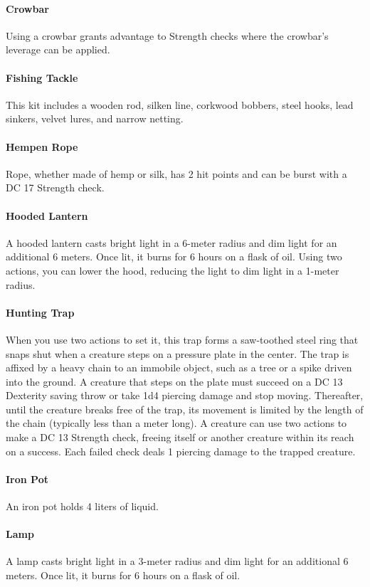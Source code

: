     \paragraph{Crowbar}
        Using a crowbar grants advantage to Strength checks where the crowbar's leverage can be applied.
    \paragraph{Fishing Tackle}
        This kit includes a wooden rod, silken line, corkwood bobbers, steel hooks, lead sinkers, velvet lures, and narrow netting.
    \paragraph{Hempen Rope}
        Rope, whether made of hemp or silk, has 2 hit points and can be burst with a DC 17 Strength check.
    \paragraph{Hooded Lantern}
        A hooded lantern casts bright light in a 6-meter radius and dim light for an additional 6 meters.
        Once lit, it burns for 6 hours on a flask of oil.
        Using two actions, you can lower the hood, reducing the light to dim light in a 1-meter radius.
    \paragraph{Hunting Trap}
        When you use two actions to set it, this trap forms a saw-toothed steel ring that snaps shut when a creature steps on a pressure plate in the center.
        The trap is affixed by a heavy chain to an immobile object, such as a tree or a spike driven into the ground.
        A creature that steps on the plate must succeed on a DC 13 Dexterity saving throw or take 1d4 piercing damage and stop moving.
        Thereafter, until the creature breaks free of the trap, its movement is limited by the length of the chain (typically less than a meter long).
        A creature can use two actions to make a DC 13 Strength check, freeing itself or another creature within its reach on a success.
        Each failed check deals 1 piercing damage to the trapped creature.
    \paragraph{Iron Pot}
        An iron pot holds 4 liters of liquid.
    \paragraph{Lamp}
        A lamp casts bright light in a 3-meter radius and dim light for an additional 6 meters.
        Once lit, it burns for 6 hours on a flask of oil.
